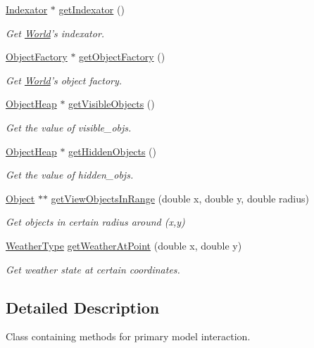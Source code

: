 \begin{DoxyCompactItemize}
\hyperlink{classIndexator}{Indexator} $\ast$ \hyperlink{classWorld_ad75ce919ba59eb32d7b9aa4b1ec89ea6}{get\-Indexator} ()
\begin{DoxyCompactList}\small\item\em Get \hyperlink{classWorld}{World}'s indexator. \end{DoxyCompactList}\item 
\hyperlink{classObjectFactory}{Object\-Factory} $\ast$ \hyperlink{classWorld_a25dfb5e9ccd3dd5540ccf6f56937ec28}{get\-Object\-Factory} ()
\begin{DoxyCompactList}\small\item\em Get \hyperlink{classWorld}{World}'s object factory. \end{DoxyCompactList}\item 
\hyperlink{classObjectHeap}{Object\-Heap} $\ast$ \hyperlink{classWorld_ae7d9c8d7590bfa0ed18ed42c05106664}{get\-Visible\-Objects} ()
\begin{DoxyCompactList}\small\item\em Get the value of visible\-\_\-objs. \end{DoxyCompactList}\item 
\hyperlink{classObjectHeap}{Object\-Heap} $\ast$ \hyperlink{classWorld_acdde856cd58e64641405806d08650004}{get\-Hidden\-Objects} ()
\begin{DoxyCompactList}\small\item\em Get the value of hidden\-\_\-objs. \end{DoxyCompactList}\item 
\hyperlink{classObject}{Object} $\ast$$\ast$ \hyperlink{classWorld_a4e16dbeed23237902f74b62f229d7d20}{get\-View\-Objects\-In\-Range} (double x, double y, double radius)
\begin{DoxyCompactList}\small\item\em Get objects in certain radius around (x,y) \end{DoxyCompactList}\item 
\hyperlink{BasicTypes_8h_aae2a79ad426e847c0ddfd77d04ce2516}{Weather\-Type} \hyperlink{classWorld_ab2c8d9f05cfbda5430d6a5e8f7754b85}{get\-Weather\-At\-Point} (double x, double y)
\begin{DoxyCompactList}\small\item\em Get weather state at certain coordinates. \end{DoxyCompactList}\end{DoxyCompactItemize}


\subsection{Detailed Description}
Class containing methods for primary model interaction. 

